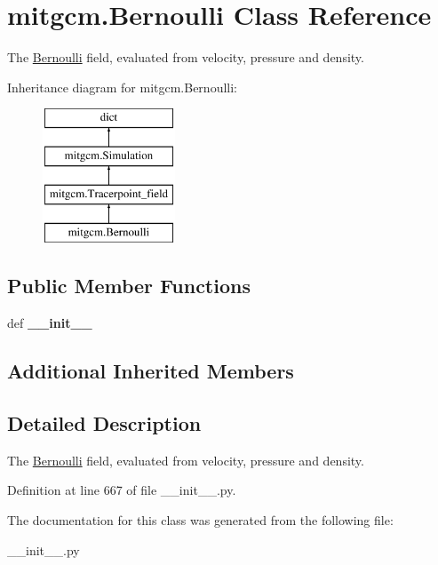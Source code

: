 \hypertarget{classmitgcm_1_1Bernoulli}{\section{mitgcm.\+Bernoulli Class Reference}
\label{classmitgcm_1_1Bernoulli}
}


The \hyperlink{classmitgcm_1_1Bernoulli}{Bernoulli} field, evaluated from velocity, pressure and density.  


Inheritance diagram for mitgcm.\+Bernoulli\+:\begin{figure}[H]
\begin{center}
\leavevmode
\includegraphics[height=4.000000cm]{classmitgcm_1_1Bernoulli}
\end{center}
\end{figure}
\subsection*{Public Member Functions}
\begin{DoxyCompactItemize}
\item 
\hypertarget{classmitgcm_1_1Bernoulli_a5f78ab27df77454ef131f5c24ca8dbf9}{def {\bfseries \+\_\+\+\_\+init\+\_\+\+\_\+}}\label{classmitgcm_1_1Bernoulli_a5f78ab27df77454ef131f5c24ca8dbf9}

\end{DoxyCompactItemize}
\subsection*{Additional Inherited Members}


\subsection{Detailed Description}
The \hyperlink{classmitgcm_1_1Bernoulli}{Bernoulli} field, evaluated from velocity, pressure and density. 



Definition at line 667 of file \+\_\+\+\_\+init\+\_\+\+\_\+.\+py.



The documentation for this class was generated from the following file\+:\begin{DoxyCompactItemize}
\item 
\+\_\+\+\_\+init\+\_\+\+\_\+.\+py\end{DoxyCompactItemize}
